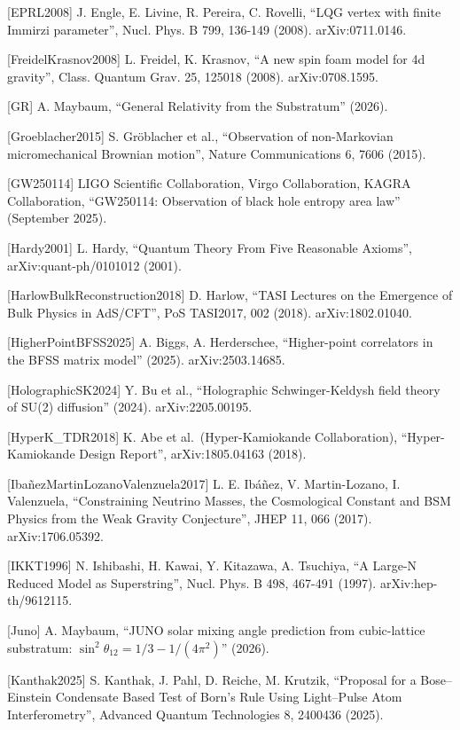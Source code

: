 \documentclass[
]{article}
\begin{document}
{[}EPRL2008{]} J. Engle, E. Livine, R. Pereira, C. Rovelli, ``LQG vertex
with finite Immirzi parameter'', Nucl. Phys. B 799, 136-149 (2008).
arXiv:0711.0146.

{[}FreidelKrasnov2008{]} L. Freidel, K. Krasnov, ``A new spin foam model
for 4d gravity'', Class. Quantum Grav. 25, 125018 (2008).
arXiv:0708.1595.

{[}GR{]} A. Maybaum, ``General Relativity from the Substratum'' (2026).

{[}Groeblacher2015{]} S. Gröblacher et al., ``Observation of
non-Markovian micromechanical Brownian motion'', Nature Communications
6, 7606 (2015).

{[}GW250114{]} LIGO Scientific Collaboration, Virgo Collaboration, KAGRA
Collaboration, ``GW250114: Observation of black hole entropy area law''
(September 2025).

{[}Hardy2001{]} L. Hardy, ``Quantum Theory From Five Reasonable
Axioms'', arXiv:quant-ph/0101012 (2001).

{[}HarlowBulkReconstruction2018{]} D. Harlow, ``TASI Lectures on the
Emergence of Bulk Physics in AdS/CFT'', PoS TASI2017, 002 (2018).
arXiv:1802.01040.

{[}HigherPointBFSS2025{]} A. Biggs, A. Herderschee, ``Higher-point
correlators in the BFSS matrix model'' (2025). arXiv:2503.14685.

{[}HolographicSK2024{]} Y. Bu et al., ``Holographic Schwinger-Keldysh
field theory of SU(2) diffusion'' (2024). arXiv:2205.00195.

{[}HyperK\_TDR2018{]} K. Abe et al.~(Hyper-Kamiokande Collaboration),
``Hyper-Kamiokande Design Report'', arXiv:1805.04163 (2018).

{[}IbañezMartinLozanoValenzuela2017{]} L. E. Ibáñez, V. Martin-Lozano,
I. Valenzuela, ``Constraining Neutrino Masses, the Cosmological Constant
and BSM Physics from the Weak Gravity Conjecture'', JHEP 11, 066 (2017).
arXiv:1706.05392.

{[}IKKT1996{]} N. Ishibashi, H. Kawai, Y. Kitazawa, A. Tsuchiya, ``A
Large-N Reduced Model as Superstring'', Nucl. Phys. B 498, 467-491
(1997). arXiv:hep-th/9612115.

{[}Juno{]} A. Maybaum, ``JUNO solar mixing angle prediction from
cubic-lattice substratum: \(\sin^2\theta_{12} = 1/3 - 1/(4\pi^2)\)''
(2026).

{[}Kanthak2025{]} S. Kanthak, J. Pahl, D. Reiche, M. Krutzik, ``Proposal
for a Bose--Einstein Condensate Based Test of Born's Rule Using
Light--Pulse Atom Interferometry'', Advanced Quantum Technologies 8,
2400436 (2025).
\end{document}
